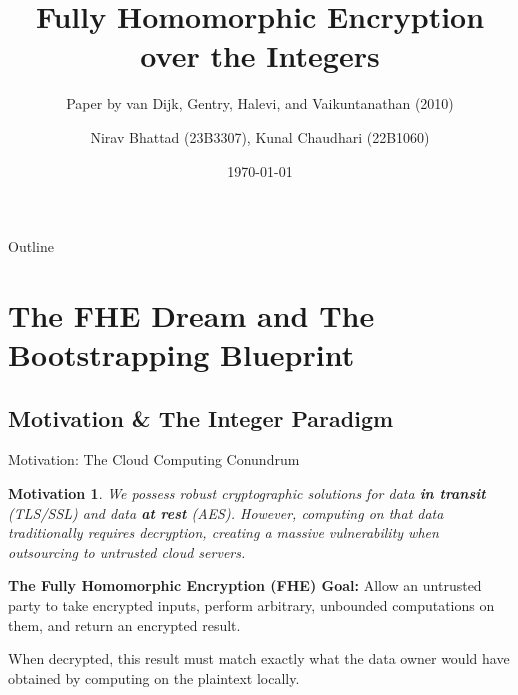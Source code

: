 \documentclass[10pt,handout]{beamer}
\title[Fully Homomorphic Encryption over the Integers]{Fully Homomorphic Encryption over the Integers}
\subtitle{Paper by van Dijk, Gentry, Halevi, and Vaikuntanathan (2010)}
\author[Nirav, Kunal]{Nirav Bhattad (23B3307), Kunal Chaudhari (22B1060)}
\date{\today}
\newtheorem{motivation}{Motivation}
\begin{document}
\begin{frame}
    \titlepage
\end{frame}

\begin{frame}{Outline}
    \tableofcontents[hideallsubsections]
\end{frame}

\section{The FHE Dream and The Bootstrapping Blueprint}

\subsection{Motivation \& The Integer Paradigm}

\begin{frame}{Motivation: The Cloud Computing Conundrum}
    \begin{motivation}
    We possess robust cryptographic solutions for data \textbf{in transit} (TLS/SSL) and data \textbf{at rest} (AES). However, computing on that data traditionally requires decryption, creating a massive vulnerability when outsourcing to untrusted cloud servers.
    \end{motivation}
    \pause
    
    \vspace{0.3cm}
    \textbf{The Fully Homomorphic Encryption (FHE) Goal:}
    Allow an untrusted party to take encrypted inputs, perform arbitrary, unbounded computations on them, and return an encrypted result. 
    \pause
    
    \vspace{0.3cm}
    When decrypted, this result must match exactly what the data owner would have obtained by computing on the plaintext locally.
\end{frame}
\end{document}
